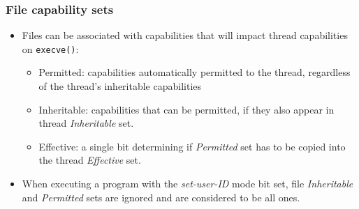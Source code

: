 \begin{frame}
	\frametitle{File capability sets}
	\begin{itemize}
		\item Files can be associated with capabilities that will impact thread
			capabilities on \texttt{execve()}:
			\begin{itemize}
				\item Permitted: capabilities automatically permitted to the thread,
					regardless of the thread's inheritable capabilities
				\item Inheritable: capabilities that can be permitted, if they also
					appear in thread \emph{Inheritable} set.
				\item Effective: a single bit determining if \emph{Permitted} set has to
					be copied into the thread \emph{Effective} set.
			\end{itemize}
		\item When executing a program with the \emph{set-user-ID} mode bit set,
			file \emph{Inheritable} and \emph{Permitted} sets are ignored and are
			considered to be all ones.
	\end{itemize}
\end{frame}


